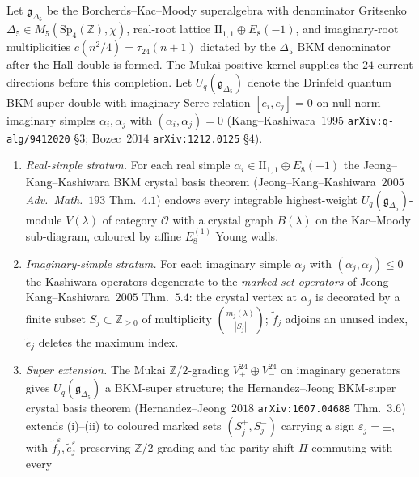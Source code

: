 \begin{proposition}
\label{prop:k3qt-crystal-basis-g-delta5-jkk-hj}
Let $\mathfrak g_{\Delta_5}$ be the Borcherds--Kac--Moody superalgebra
with denominator Gritsenko $\Delta_5 \in M_5(\mathrm{Sp}_4(\mathbb Z),
\chi)$, real-root lattice $\mathrm{II}_{1,1} \oplus E_8(-1)$, and
imaginary-root multiplicities $c(n^2/4) = \tau_{24}(n+1)$ dictated by
the $\Delta_5$ BKM denominator after the Hall double is formed. The
Mukai positive kernel supplies the $24$ current directions before this
completion. Let
$U_q(\mathfrak g_{\Delta_5})$ denote the Drinfeld quantum BKM-super
double with imaginary Serre relation $[e_i, e_j] = 0$ on null-norm
imaginary simples $\alpha_i, \alpha_j$ with $(\alpha_i, \alpha_j) = 0$
(Kang--Kashiwara~$1995$ \texttt{arXiv:q-alg/9412020} \S$3$;
Bozec~$2014$ \texttt{arXiv:1212.0125} \S$4$).
\begin{enumerate}[label=\textup{(\roman*)}]
\item \emph{Real-simple stratum.} For each real simple
$\alpha_i \in \mathrm{II}_{1,1} \oplus E_8(-1)$ the
Jeong--Kang--Kashiwara BKM crystal basis theorem
(Jeong--Kang--Kashiwara~$2005$ \emph{Adv.~Math.}~$193$ Thm.~$4.1$)
endows every integrable highest-weight
$U_q(\mathfrak g_{\Delta_5})$-module $V(\lambda)$ of category
$\mathcal O$ with a crystal graph $B(\lambda)$ on the Kac--Moody
sub-diagram, coloured by affine $E_8^{(1)}$ Young walls.
\item \emph{Imaginary-simple stratum.} For each imaginary simple
$\alpha_j$ with $(\alpha_j, \alpha_j) \leq 0$ the Kashiwara operators
degenerate to the \emph{marked-set operators} of
Jeong--Kang--Kashiwara~$2005$ Thm.~$5.4$: the crystal vertex at
$\alpha_j$ is decorated by a finite subset
$S_j \subset \mathbb Z_{\geq 0}$ of multiplicity
$\binom{m_j(\lambda)}{|S_j|}$; $\tilde f_j$ adjoins an unused index,
$\tilde e_j$ deletes the maximum index.
\item \emph{Super extension.} The Mukai $\mathbb Z/2$-grading
$V_+^{24} \oplus V_-^{24}$ on imaginary generators gives
$U_q(\mathfrak g_{\Delta_5})$ a BKM-super structure; the
Hernandez--Jeong BKM-super crystal basis theorem
(Hernandez--Jeong~$2018$ \texttt{arXiv:1607.04688} Thm.~$3.6$) extends
(i)--(ii) to coloured marked sets $(S_j^+, S_j^-)$ carrying a sign
$\varepsilon_j = \pm$, with
$\tilde f_j^\varepsilon, \tilde e_j^\varepsilon$ preserving
$\mathbb Z/2$-grading and the parity-shift $\Pi$ commuting with every

\end{enumerate}
\end{proposition}
